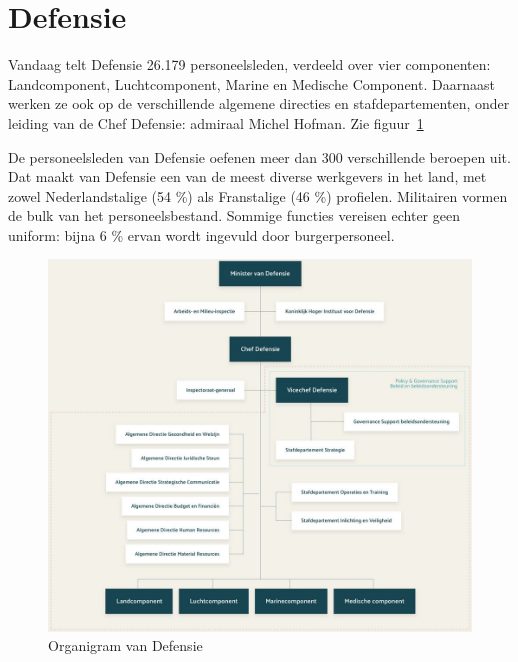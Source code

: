 
\section{Defensie}
\label{sec:defensie}
Vandaag telt Defensie 26.179 personeelsleden, verdeeld over vier componenten: Landcomponent, Luchtcomponent, Marine en Medische Component. Daarnaast werken ze ook op de verschillende algemene directies en stafdepartementen, onder leiding van de Chef Defensie: admiraal Michel Hofman. Zie figuur~\ref{fig:organigram-defensie}

De personeelsleden van Defensie oefenen meer dan 300 verschillende beroepen uit. Dat maakt van Defensie een van de meest diverse werkgevers in het land, met zowel Nederlandstalige (54 \%) als Franstalige (46 \%) profielen. Militairen vormen de bulk van het personeelsbestand. Sommige functies vereisen echter geen uniform: bijna 6 \% ervan wordt ingevuld door burgerpersoneel.

\begin{figure}
    \includegraphics[width=\textwidth]{img/organigram-defensie.png}
    \caption{\label{fig:organigram-defensie}Organigram van Defensie}
\end{figure}


